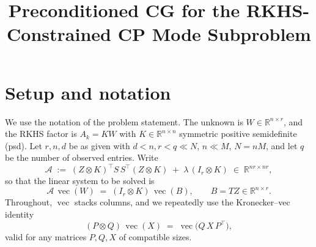 \documentclass[12pt]{article}
\title{Preconditioned CG for the RKHS-Constrained CP Mode Subproblem}
\author{}
\date{}
\DeclareMathOperator{\vecop}{vec}
\newcommand{\bR}{\mathbb{R}}
\begin{document}
\maketitle

\section{Setup and notation}

We use the notation of the problem statement. The unknown is $W\in\bR^{n\times r}$,
and the RKHS factor is $A_k=KW$ with $K\in\bR^{n\times n}$ symmetric positive
semidefinite (psd). Let $r,n,d$ be as given with $d<n,r<q\ll N$, $n\ll M$,
$N=nM$, and let $q$ be the number of observed entries. Write
\begin{equation}\label{eq:Adef}
  \mathcal{A}
  \;:=\;
  (Z\otimes K)^{\!\top} S\,S^{\!\top}(Z\otimes K)
  \;+\;\lambda\,(I_r\otimes K)\;\in\;\bR^{nr\times nr},
\end{equation}
so that the linear system to be solved is
\begin{equation}\label{eq:system}
  \mathcal{A}\,\vecop(W)\;=\;(I_r\otimes K)\,\vecop(B),
  \qquad B=TZ\in\bR^{n\times r}.
\end{equation}
Throughout, $\vecop$ stacks columns, and we repeatedly use the Kronecker--vec
identity
\begin{equation}\label{eq:kronvec}
  (P\otimes Q)\,\vecop(X)\;=\;\vecop\!\big(Q\,X\,P^{\!\top}\big),
\end{equation}
valid for any matrices $P,Q,X$ of compatible sizes.
\end{document}

